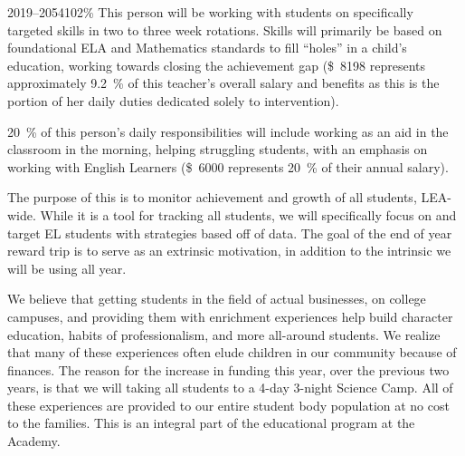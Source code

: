 \documentclass{article}
\newcommand{\dollar}[1]{\SI{#1}[\$]{}}
\newcounter{goal}[section] %
\begin{document}
\begin{demIISUP}{2019--20}{54102}{\si{\percent}}
 This person will be working with students on specifically targeted skills in two to three week rotations. Skills will primarily be based on foundational ELA and Mathematics standards to fill ``holes'' in a child's education, working towards closing the achievement gap (\dollar{8198} represents approximately \SI{9.2}{\percent} of this teacher's overall salary and benefits as this is the portion of her daily duties dedicated solely to intervention).

 \SI{20}{\percent} of this person's daily responsibilities will include working as an aid in the classroom in the morning, helping struggling students, with an emphasis on working with English Learners (\dollar{6000} represents \SI{20}{\percent} of their annual salary).

 The purpose of this is to monitor achievement and growth of all students, LEA-wide. While it is a tool for tracking all students, we will specifically focus on and target EL students with strategies based off of data. The goal of the end of year reward trip is to serve as an extrinsic motivation, in addition to the intrinsic we will be using all year.

 We believe that getting students in the field of actual businesses, on college campuses, and providing them with enrichment experiences help build character education, habits of professionalism, and more all-around students. We realize that many of these experiences often elude children in our community because of finances. The reason for the increase in funding this year, over the previous two years, is that we will taking all students to a 4-day 3-night Science Camp. All of these experiences are provided to our entire student body population at no cost to the families. This is an integral part of the educational program at the Academy.
\end{demIISUP}
\end{document}
